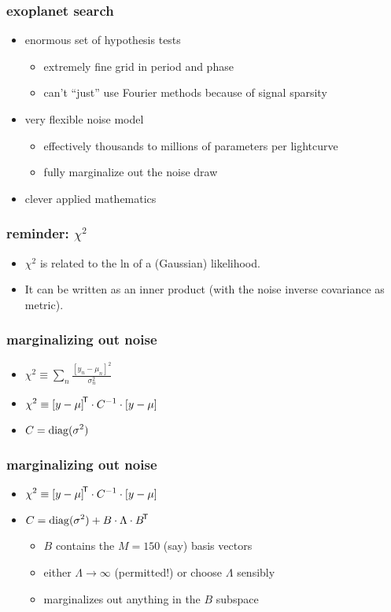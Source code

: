 \documentclass[pdftex]{beamer}
\begin{document}
\begin{frame}
  \frametitle{exoplanet search}
  \begin{itemize}
  \item enormous set of hypothesis tests
    \begin{itemize}
    \item extremely fine grid in period and phase
    \item can't ``just'' use Fourier methods because of signal sparsity
    \end{itemize}
  \item very flexible noise model
    \begin{itemize}
    \item effectively thousands to millions of parameters per lightcurve
    \item fully marginalize out the noise draw
    \end{itemize}
  \item clever applied mathematics
  \end{itemize}
\end{frame}

\begin{frame}
  \frametitle{reminder: $\chi^2$}
  \begin{itemize}
  \item $\chi^2$ is related to the ln of a (Gaussian) likelihood.
  \item It can be written as an inner product (with the noise inverse
    covariance as metric).
  \end{itemize}
\end{frame}

\begin{frame}
  \frametitle{marginalizing out noise}
  \begin{itemize}
  \item $\displaystyle\chi^2\equiv\sum_n\frac{[y_n - \mu_n]^2}{\sigma_n^2}$
  \item $\displaystyle\chi^2\equiv{[y - \mu]}^{\mathsf{\!T}}\cdot C^{-1}\cdot[y - \mu]$
  \item $\displaystyle C = \operatorname*{diag}(\sigma^2)$
  \end{itemize}
\end{frame}

\begin{frame}
  \frametitle{marginalizing out noise}
  \begin{itemize}
  \item $\displaystyle\chi^2\equiv{[y - \mu]}^{\mathsf{\!T}}\cdot C^{-1}\cdot[y - \mu]$
  \item $\displaystyle C = \operatorname*{diag}(\sigma^2) + B\cdot\Lambda\cdot{B}^{\mathsf{\!T}}$
    \begin{itemize}
    \item $B$ contains the $M=150$ (say) basis vectors
    \item either $\Lambda\rightarrow\infty$ (permitted!) or choose $\Lambda$ sensibly
    \item marginalizes out anything in the $B$ subspace
    \end{itemize}
  \end{itemize}
\end{frame}
\end{document}
